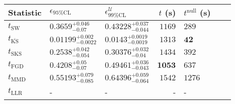 \begin{tabular}{l|llr|llr}
	Statistic & $\epsilon_{95\%\mathrm{CL}}$ & $\epsilon^    {\mathcal{U}}_{99\%\mathrm{CL}}$ & $t$ (s) & $t^{\mathrm{null}}$ (s) \\
	\midrule
	$t_{\mathrm{SW}}$ & $0.3659_{-0.07}^{+0.046}$ & $0.43228_{-0.044}^{+0.037}$ & $1169$ & $289$ \\
	$t_{\overline{\mathrm{KS}}}$ & ${\mathbf{0.01199_{-0.0022}^{+0.002}}}$ & ${\mathbf{0.0143_{-0.0019}^{+0.0019}}}$ & $1313$ & ${\mathbf{42}}$ \\
	$t_{\mathrm{SKS}}$ & $0.2538_{-0.054}^{+0.042}$ & $0.30376_{-0.04}^{+0.032}$ & $1434$ & $392$ \\
	$t_{\mathrm{FGD}}$ & $0.4208_{-0.07}^{+0.05}$ & $0.49461_{-0.043}^{+0.036}$ & ${\mathbf{1053}}$ & $637$ \\
	$t_{\mathrm{MMD}}$ & $0.55193_{-0.085}^{+0.079}$ & $0.64396_{-0.064}^{+0.059}$ & $1542$ & $1276$ \\
	$t_{\mathrm{LLR}}$ & - & - & - & - \\
	\bottomrule
\end{tabular}